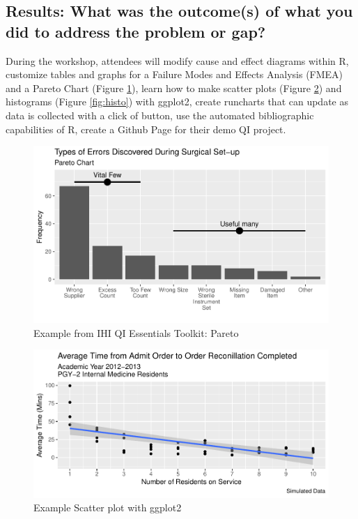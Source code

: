 \documentclass[
]{article}
\begin{document}
\hypertarget{results-what-was-the-outcomes-of-what-you-did-to-address-the-problem-or-gap}{%
\subsection{Results: What was the outcome(s) of what you did to address the problem or gap?}\label{results-what-was-the-outcomes-of-what-you-did-to-address-the-problem-or-gap}}

During the workshop, attendees will modify cause and effect diagrams within R, customize tables and graphs for a Failure Modes and Effects Analysis (FMEA) and a Pareto Chart (Figure \ref{fig:pareto}), learn how to make scatter plots (Figure \ref{fig:scatter}) and histograms (Figure \ref{fig:histo}) with ggplot2, create runcharts that can update as data is collected with a click of button, use the automated bibliographic capabilities of R, create a Github Page for their demo QI project.

\begin{figure}

{\centering \includegraphics{qi_workshop_files/figure-latex/pareto-1} 

}

\caption{Example from IHI QI Essentials Toolkit: Pareto}\label{fig:pareto}
\end{figure}

\begin{figure}

{\centering \includegraphics{qi_workshop_files/figure-latex/scatter-1} 

}

\caption{Example Scatter plot with ggplot2}\label{fig:scatter}
\end{figure}
\end{document}
